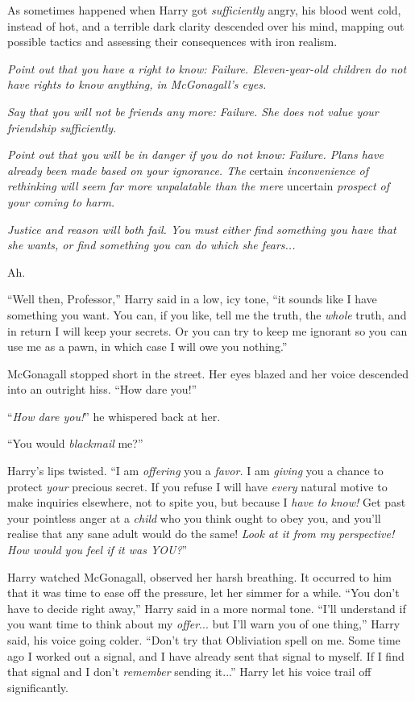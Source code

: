 As sometimes happened when Harry got \emph{sufficiently} angry, his blood went cold, instead of hot, and a terrible dark clarity descended over his mind, mapping out possible tactics and assessing their consequences with iron realism.

\emph{Point out that you have a right to know: Failure. Eleven-year-old children do not have rights to know anything, in McGonagall's eyes.}

\emph{Say that you will not be friends any more: Failure. She does not value your friendship sufficiently.}

\emph{Point out that you will be in danger if you do not know: Failure. Plans have already been made based on your ignorance. The} certain \emph{inconvenience of rethinking will seem far more unpalatable than the mere} uncertain \emph{prospect of your coming to harm.}

\emph{Justice and reason will both fail. You must either find something you have that she wants, or find something you can do which she fears...}

Ah.

``Well then, Professor,'' Harry said in a low, icy tone, ``it sounds like I have something you want. You can, if you like, tell me the truth, the \emph{whole} truth, and in return I will keep your secrets. Or you can try to keep me ignorant so you can use me as a pawn, in which case I will owe you nothing.''

McGonagall stopped short in the street. Her eyes blazed and her voice descended into an outright hiss. ``How dare you!''

``\emph{How dare you!}'' he whispered back at her.

``You would \emph{blackmail} me?''

Harry's lips twisted. ``I am \emph{offering} you a \emph{favor.} I am \emph{giving} you a chance to protect \emph{your} precious secret. If you refuse I will have \emph{every} natural motive to make inquiries elsewhere, not to spite you, but because I \emph{have to know!} Get past your pointless anger at a \emph{child} who you think ought to obey you, and you'll realise that any sane adult would do the same! \emph{Look at it from my perspective! How would you feel if it was YOU?}''

Harry watched McGonagall, observed her harsh breathing. It occurred to him that it was time to ease off the pressure, let her simmer for a while. ``You don't have to decide right away,'' Harry said in a more normal tone. ``I'll understand if you want time to think about my \emph{offer}... but I'll warn you of one thing,'' Harry said, his voice going colder. ``Don't try that Obliviation spell on me. Some time ago I worked out a signal, and I have already sent that signal to myself. If I find that signal and I don't \emph{remember} sending it...'' Harry let his voice trail off significantly.

